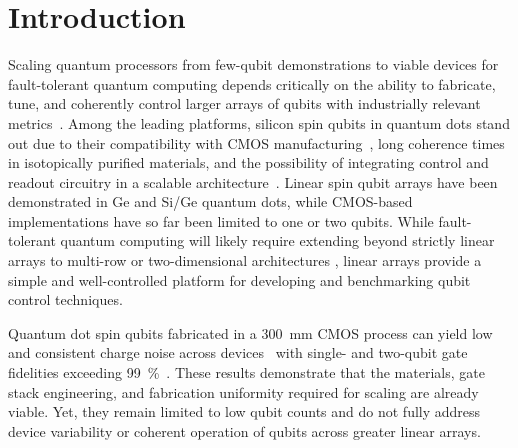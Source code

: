 \documentclass[superscriptaddress,twocolumn,10pt,prl,floatfix,nofootinbib,aps]{revtex4-2}
\newcommand{\change}[1]{%
\textcolor{reviewercolor}{\ignorespaces#1\unskip}%
}
\begin{document}
\section{Introduction}
\noindent
Scaling quantum processors from few-qubit demonstrations to viable devices for fault-tolerant quantum computing depends critically on the ability to fabricate, tune, and coherently control larger arrays of qubits with industrially relevant metrics~\cite{taylor_fault-tolerant_2005, kane_silicon-based_1998, kim_evidence_2023, acharya_quantum_2025}.  %
Among the leading platforms, silicon spin qubits in quantum dots stand out due to their compatibility with CMOS manufacturing~\cite{veldhorst_silicon_2017, gonzalez-zalba_scaling_2021, zwerver_qubits_2022}, long coherence times in isotopically purified materials, and the possibility of integrating control and readout circuitry in a scalable architecture~\cite{bartee_spin-qubit_2025, stuyck_cmos_2026, thomas_rapid_2025}. Linear spin qubit arrays have been demonstrated in Ge\cite{hendrickx_four-qubit_2021, jirovec_mitigation_2025, john_robust_2025} and Si/Ge\cite{philips_universal_2022, fernandez_de_fuentes_running_2026, ha_two-dimensional_2025, undseth_weight-four_2026, tidjani_three-dimensional_2025} quantum dots, while CMOS-based implementations have so far been limited to one or two qubits\cite{stuyck_demonstration_2024, huang_high-fidelity_2024, steinacker_bell_2025, steinacker_industry-compatible_2025, yang_operation_2020}.
\change{
    While fault-tolerant quantum computing will likely require extending beyond strictly linear arrays to multi-row or two-dimensional architectures \cite{ha_two-dimensional_2025, siegel_towards_2024, boter_spiderweb_2022}, linear arrays provide a simple and well-controlled platform for developing and benchmarking qubit control techniques.
    }

Quantum dot spin qubits fabricated in a \SI{300}{\milli \meter} CMOS process can yield low and consistent charge noise across devices~\cite{elsayed_low_2024} with single- and two-qubit gate fidelities exceeding \SI{99}{\percent}~\cite{stuyck_demonstration_2024, steinacker_industry-compatible_2025}. These results demonstrate that the materials, gate stack engineering, and fabrication uniformity required for scaling are already viable. Yet, they remain limited to low qubit counts and do not fully address device variability or coherent operation of qubits across greater linear arrays.
\end{document}
